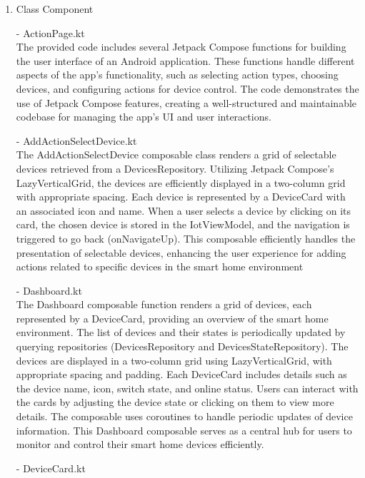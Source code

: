 \begin{enumerate}[label=\arabic*]
\begin{enumerate}[label=\alph*]
\begin{enumerate}
            \item Class Component \\
                \item[-] ActionPage.kt \\
                The provided code includes several Jetpack Compose functions for building the user interface of an Android application. These functions handle different aspects of the app's functionality, such as selecting action types, choosing devices, and configuring actions for device control. The code demonstrates the use of Jetpack Compose features, creating a well-structured and maintainable codebase for managing the app's UI and user interactions.\\
                \item[-] AddActionSelectDevice.kt \\
                The AddActionSelectDevice composable class renders a grid of selectable devices retrieved from a DevicesRepository. Utilizing Jetpack Compose's LazyVerticalGrid, the devices are efficiently displayed in a two-column grid with appropriate spacing. Each device is represented by a DeviceCard with an associated icon and name. When a user selects a device by clicking on its card, the chosen device is stored in the IotViewModel, and the navigation is triggered to go back (onNavigateUp). This composable efficiently handles the presentation of selectable devices, enhancing the user experience for adding actions related to specific devices in the smart home environment\\
                \item[-] Dashboard.kt \\
                The Dashboard composable function renders a grid of devices, each represented by a DeviceCard, providing an overview of the smart home environment. The list of devices and their states is periodically updated by querying repositories (DevicesRepository and DevicesStateRepository). The devices are displayed in a two-column grid using LazyVerticalGrid, with appropriate spacing and padding. Each DeviceCard includes details such as the device name, icon, switch state, and online status. Users can interact with the cards by adjusting the device state or clicking on them to view more details. The composable uses coroutines to handle periodic updates of device information. This Dashboard composable serves as a central hub for users to monitor and control their smart home devices efficiently.\\
                \item[-] DeviceCard.kt \\

\end{enumerate}
\end{enumerate}
\end{enumerate}
